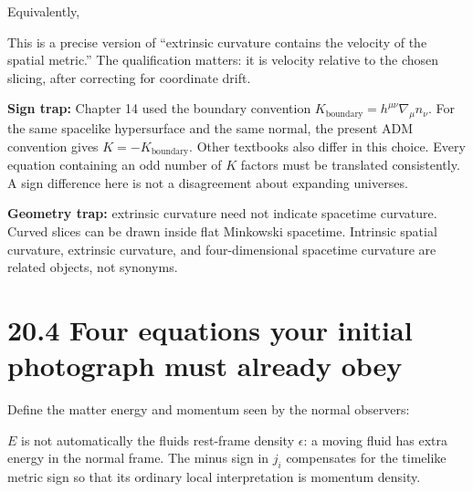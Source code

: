 \documentclass[
  11pt,
  letterpaper,
  oneside,
  openany]{scrbook}
\begin{document}
Equivalently,

\begin{center}
\begingroup
{}
\ifdim\wd\grmathbox>\linewidth
\resizebox{\linewidth}{!}{\usebox{\grmathbox}}
\else\usebox{\grmathbox}\fi
\endgroup
\end{center}

This is a precise version of ``extrinsic curvature contains the velocity
of the spatial metric.'' The qualification matters: it is velocity
relative to the chosen slicing, after correcting for coordinate drift.

\textbf{Sign trap:} Chapter 14 used the boundary convention
\(K_{\mathrm{boundary}}=h^{\mu\nu}\nabla_\mu n_\nu\). For the same
spacelike hypersurface and the same normal, the present ADM convention
gives \(K=-K_{\mathrm{boundary}}\). Other textbooks also differ in this
choice. Every equation containing an odd number of \(K\) factors must be
translated consistently. A sign difference here is not a disagreement
about expanding universes.

\textbf{Geometry trap:} extrinsic curvature need not indicate spacetime
curvature. Curved slices can be drawn inside flat Minkowski spacetime.
Intrinsic spatial curvature, extrinsic curvature, and four-dimensional
spacetime curvature are related objects, not synonyms.

\hypertarget{four-equations-your-initial-photograph-must-already-obey}{%
\section{20.4 Four equations your initial photograph must already
obey}\label{four-equations-your-initial-photograph-must-already-obey}}

Define the matter energy and momentum seen by the normal observers:

\begin{center}
\begingroup
{}
\ifdim\wd\grmathbox>\linewidth
\resizebox{\linewidth}{!}{\usebox{\grmathbox}}
\else\usebox{\grmathbox}\fi
\endgroup
\end{center}

\(E\) is not automatically the fluid\textquotesingle s rest-frame
density \(\epsilon\): a moving fluid has extra energy in the normal
frame. The minus sign in \(j_i\) compensates for the timelike metric
sign so that its ordinary local interpretation is momentum density.
\end{document}
